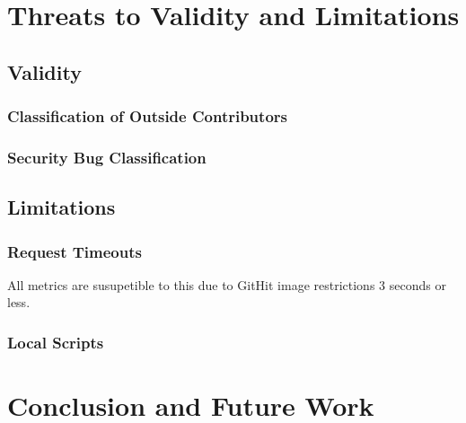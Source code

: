 \documentclass[12pt, letterpaper]{article}
\begin{document}
\section{Threats to Validity and Limitations}
\subsection{Validity}
\subsubsection{Classification of Outside Contributors}
\subsubsection{Security Bug Classification}

\subsection{Limitations}
\subsubsection{Request Timeouts}
All metrics are susupetible to this due to GitHit image restrictions  3 seconds or less. 
\subsubsection{Local Scripts}


\section{Conclusion and Future Work}


\newpage


\end{document}
